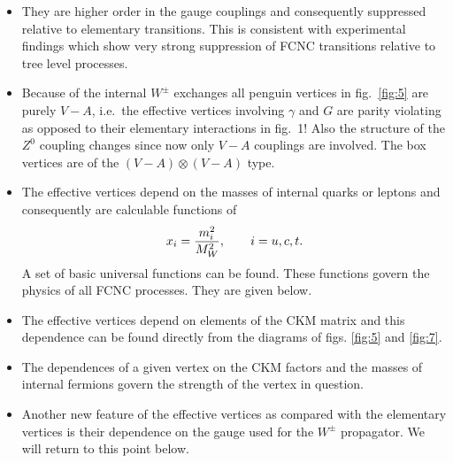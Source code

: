 \documentclass[12pt]{article}
\begin{document}
\begin{itemize}
\begin{itemize}
\item
They are higher order in the gauge couplings and consequently
suppressed relative to elementary transitions. This is consistent
with experimental findings which show very strong suppression
of FCNC transitions relative to tree level processes.
\item
Because of the internal $W^{\pm}$ exchanges all penguin
vertices in fig.\ \ref{fig:5} are purely $V-A$, 
i.e.\ the effective vertices
involving $\gamma$ and $G$ are parity violating as opposed to their
elementary interactions in fig.\ 1! Also the structure of the $Z^0$ coupling
changes since now only $V-A$ couplings are involved. The box vertices
are of the $(V-A)\otimes(V-A)$ type.
\item
The effective vertices depend on the masses of internal
quarks or leptons and consequently are calculable functions of
\begin{equation}
x_i = {{m_i^2}\over{M_W^2}},\qquad i=u,c,t.
\end{equation}
A set of basic universal functions can be found. These functions
govern the physics of all FCNC processes. They are given below.
\item
The effective vertices depend on elements of the CKM
matrix and this dependence can be found directly from the diagrams of
figs. \ref{fig:5} and \ref{fig:7}.
\item
The dependences of a given  vertex on 
 the CKM factors and the masses of internal fermions 
govern  the strength of the vertex in question.
\item
Another new feature of the effective vertices 
 as compared with the elementary vertices is their dependence on
the gauge used for the $W^{\pm}$ propagator. We will return to this
point below.
\end{itemize}


\end{itemize}
\end{document}

